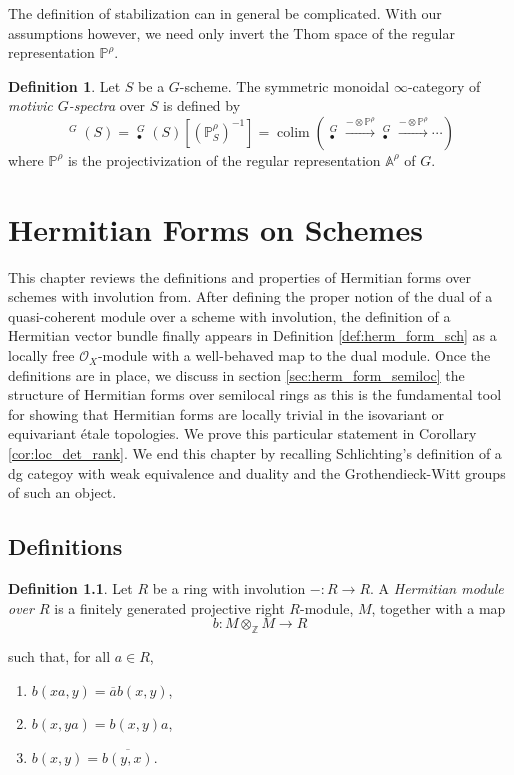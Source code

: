 \documentclass[edeposit,fullpage]{uiucthesis2009}
\newcommand{\Z}{\mathbb Z}
\newcommand{\mbb}{\mathbb}
\newcommand{\mc}{\mathcal}
\DeclareMathOperator*{\colim}{colim}
\DeclareMathOperator{\SH}{\underline{SH}}
\DeclareMathOperator{\HH}{\underline{H}}
\theoremstyle{plain}
\numberwithin{lemma}{section}
\theoremstyle{definition}
\newtheorem{definition}[lemma]{Definition}
\begin{document}
The definition of stabilization can in general be complicated. With
our assumptions however, we need only invert the Thom space of the
regular representation $\mbb P^\rho$.

\begin{definition}
Let $S$ be a $G$-scheme. The symmetric monoidal $\infty$-category of
\emph{motivic $G$-spectra} over $S$ is defined by 
\[
\SH^G(S) = \HH_\bullet^G(S)[(\mbb P^{\rho}_S)^{-1}] = \colim
\left(\HH_\bullet^G \xrightarrow{-\otimes \mbb P^\rho} \HH_\bullet^G
  \xrightarrow{-\otimes \mbb P^\rho} \cdots \right)
\]
where $\mbb P^\rho$ is the projectivization of the regular
representation $\mbb A^\rho$ of $G$.
\end{definition}

\chapter{Hermitian Forms on Schemes}\label{chap:herm_form_sch}

This chapter reviews the definitions and properties of Hermitian forms over schemes
with involution from\cite{Xie2018ATM}. After defining the proper
notion of the dual of a quasi-coherent module over a scheme with involution, the definition of a Hermitian vector bundle finally
appears in Definition \ref{def:herm_form_sch} as a locally free $\mc
O_X$-module with a well-behaved map to the dual module. Once the
definitions are in place, we discuss in section
\ref{sec:herm_form_semiloc} the structure of Hermitian forms over
semilocal rings as this is the fundamental tool for showing that Hermitian forms
are locally trivial in the isovariant or equivariant \'etale
topologies. We prove this particular statement in Corollary
\ref{cor:loc_det_rank}. We end this chapter by recalling Schlichting's
definition of a dg categoy with weak equivalence and duality and the
Grothendieck-Witt groups of such an object.  

\section{Definitions}\label{sec:herm_def}

\begin{definition}
Let $R$ be a ring with involution $- : R \rightarrow R$. A \emph{Hermitian
module over $R$} is a finitely generated projective right $R$-module, $M$, together
with a map
\[
b : M \otimes_{\Z} M \rightarrow R
\]  

such that, for all $a \in R$,
\begin{enumerate}
\item $b(xa,y) = \overline a b(x,y)$,
\item $b(x,ya) = b(x,y) a$,
\item $b(x,y) = \overline{b(y,x)}$.
\end{enumerate}
\end{definition}
\end{document}
